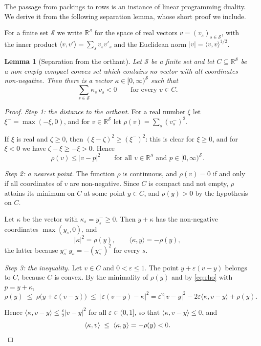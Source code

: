 \documentclass[11pt,reqno]{amsart}
\newtheorem{lemma}[theorem]{Lemma}
\theoremstyle{definition}
\theoremstyle{remark}
\numberwithin{equation}{section}
\theoremstyle{named}
\theoremstyle{plain}
\newcommand{\R}{\mathbb{R}}
\newcommand{\eps}{\varepsilon}
\newcommand{\abs}[1]{\lvert #1\rvert}
\begin{document}
The passage from packings to rows is an instance of linear programming duality. We derive it from the
following separation lemma, whose short proof we include.

For a finite set $\mathcal S$ we write
$\R^{\mathcal S}$ for the space of real vectors $v=(v_s)_{s\in\mathcal S}$, with the inner product
$\langle v,v'\rangle=\sum_sv_sv'_s$ and the Euclidean norm $\abs{v}=\langle v,v\rangle^{1/2}$.

\begin{lemma}[Separation from the orthant]\label{lem:separation}
Let $\mathcal S$ be a finite set and let $C\subseteq\R^{\mathcal S}$ be a non-empty compact convex set
which contains no vector with all coordinates non-negative. Then there is a vector
$\kappa\in[0,\infty)^{\mathcal S}$ such that
\[
   \sum_{s\in\mathcal S}\kappa_s\,v_s<0\qquad\text{for every }v\in C .
\]
\end{lemma}

\begin{proof}
\emph{Step 1: the distance to the orthant.} For a real number $\xi$ let $\xi^{-}=\max(-\xi,0)$, and
for $v\in\R^{\mathcal S}$ let
$\rho(v)=\sum_s(v_s^{-})^{2}$.

If $\xi$ is real and $\zeta\ge0$, then $(\xi-\zeta)^{2}\ge(\xi^{-})^{2}$:
this is clear for $\xi\ge0$, and for $\xi<0$ we have $\zeta-\xi\ge-\xi>0$. Hence
\begin{equation}\label{eq:rho}
   \rho(v)\le\abs{v-p}^{2}\qquad\text{for all }v\in\R^{\mathcal S}\text{ and }p\in[0,\infty)^{\mathcal S}.
\end{equation}

\smallskip
\emph{Step 2: a nearest point.} The function $\rho$ is continuous, and $\rho(v)=0$ if and only if
all coordinates of $v$ are
non-negative. Since $C$ is compact and not empty, $\rho$ attains its minimum on $C$ at some point
$y\in C$, and $\rho(y)>0$ by the hypothesis on $C$.

Let $\kappa$ be the vector with
$\kappa_s=y_s^{-}\ge0$. Then $y+\kappa$ has the non-negative coordinates $\max(y_s,0)$, and
\[
   \abs{\kappa}^{2}=\rho(y),\qquad \langle\kappa,y\rangle=-\rho(y),
\]
the latter because $y_s^{-}\,y_s=-(y_s^{-})^{2}$ for every $s$.

\smallskip
\emph{Step 3: the inequality.} Let $v\in C$ and $0<\eps\le1$. The
point $y+\eps(v-y)$ belongs to $C$, because $C$ is convex. By the minimality of $\rho(y)$ and by
\eqref{eq:rho} with $p=y+\kappa$,
\[
   \rho(y)\;\le\;\rho\bigl(y+\eps(v-y)\bigr)\;\le\;\abs{\eps(v-y)-\kappa}^{2}
   =\eps^{2}\abs{v-y}^{2}-2\eps\langle\kappa,v-y\rangle+\rho(y).
\]

Hence $\langle\kappa,v-y\rangle\le\frac{\eps}{2}\abs{v-y}^{2}$ for all $\eps\in(0,1]$, so that
$\langle\kappa,v-y\rangle\le0$, and
\[
   \langle\kappa,v\rangle\;\le\;\langle\kappa,y\rangle=-\rho(y)<0 . \qedhere
\]
\end{proof}
\end{document}
